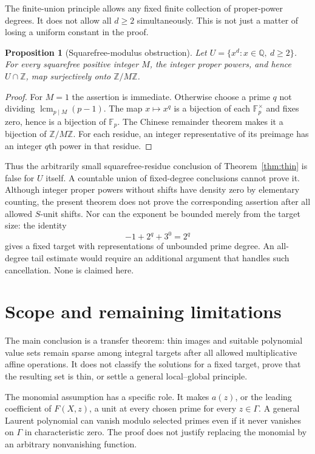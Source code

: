 \documentclass[11pt,a4paper]{article}
\newtheorem{proposition}[theorem]{Proposition}
\theoremstyle{definition}
\theoremstyle{remark}
\newcommand{\Q}{\mathbb Q}
\newcommand{\Z}{\mathbb Z}
\newcommand{\F}{\mathbb F}
\DeclareMathOperator{\lcm}{lcm}
\begin{document}
The finite-union principle allows any fixed finite collection of
proper-power degrees. It does not allow all $d\ge2$ simultaneously.
This is not just a matter of losing a uniform constant in the proof.

\begin{proposition}[Squarefree-modulus obstruction]\label{prop:allpowers}
Let $U=\{x^d:x\in\Q,\ d\ge2\}$. For every squarefree positive integer
$M$, the integer proper powers, and hence $U\cap\Z$, map surjectively
onto $\Z/M\Z$.
\end{proposition}
\begin{proof}
For $M=1$ the assertion is immediate. Otherwise choose a prime $q$
not dividing $\lcm_{p\mid M}(p-1)$. The map $x\mapsto x^q$ is a
bijection of each $\F_p^\times$ and fixes zero, hence is a bijection
of $\F_p$. The Chinese remainder theorem makes it a bijection of
$\Z/M\Z$. For each residue, an integer representative of its preimage
has an integer $q$th power in that residue.
\end{proof}

Thus the arbitrarily small squarefree-residue conclusion of
Theorem~\ref{thm:thin} is false for $U$ itself. A countable union of
fixed-degree conclusions cannot prove it. Although integer proper
powers without shifts have density zero by elementary counting, the
present theorem does not prove the corresponding assertion after all
allowed $S$-unit shifts. Nor can the exponent be bounded merely from
the target size: the identity
\[
 -1+2^q+3^0=2^q
\]
gives a fixed target with representations of unbounded prime degree.
An all-degree tail estimate would require an additional argument that
handles such cancellation. None is claimed here.

\section{Scope and remaining limitations}\label{sec:scope}

The main conclusion is a transfer theorem: thin images and suitable
polynomial value sets remain sparse among integral targets after all
allowed multiplicative affine operations. It does not classify the
solutions for a fixed target, prove that the resulting set is thin,
or settle a general local--global principle.

The monomial assumption has a specific role. It makes $a(z)$, or the
leading coefficient of $F(X,z)$, a unit at every chosen prime for every
$z\in\Gamma$. A general Laurent polynomial can vanish modulo selected
primes even if it never vanishes on $\Gamma$ in characteristic zero.
The proof does not justify replacing the monomial by an arbitrary
nonvanishing function.
\end{document}
